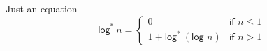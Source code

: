 \documentclass[xcolor=dvipsnames]{beamer} %
\begin{document}
\begin{frame}
    \begin{block}{Just an equation}
        \begin{equation}
            \textsf{log}^*\ n=\left\{
                \begin{array}{ll}
                  0 & \textsf{if }n \leq 1\\
                  1 + \textsf{log}^*~(\textsf{log }n) & \textsf{if } n > 1
                \end{array}
              \right.
        \end{equation}
    \end{block}
\end{frame}
\end{document}
